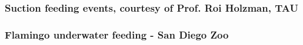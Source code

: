 \begin{frame}[label=app-1]
    \frametitle{Suction feeding events, courtesy of Prof. Roi Holzman, TAU}
\end{frame}
    
    \begin{frame}[label=app-2]
    \frametitle{Flamingo underwater feeding - San Diego Zoo}
    \begin{center}
    \end{center}
    \end{frame}
    
    

